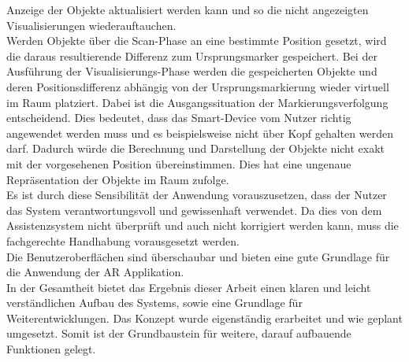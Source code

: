 Anzeige der Objekte aktualisiert werden kann und so die nicht angezeigten Visualisierungen wiederauftauchen.
\\ 
\linebreak
Werden Objekte über die Scan-Phase an eine bestimmte Position gesetzt, wird die daraus resultierende Differenz zum Ursprungsmarker gespeichert. Bei der 
Ausführung der Visualisierungs-Phase werden die gespeicherten Objekte und deren Positionsdifferenz abhängig von der Ursprungsmarkierung wieder virtuell im Raum platziert. 
Dabei ist die Ausgangssituation der Markierungsverfolgung entscheidend. Dies bedeutet, dass das Smart-Device vom Nutzer richtig angewendet werden muss und es beispielsweise 
nicht über Kopf gehalten werden darf. Dadurch würde die Berechnung und Darstellung der Objekte nicht exakt mit der vorgesehenen Position übereinstimmen. Dies hat eine 
ungenaue Repräsentation der Objekte im Raum zufolge. 
\\ 
Es ist durch diese Sensibilität der Anwendung vorauszusetzen, dass der Nutzer das System verantwortungsvoll und gewissenhaft verwendet. Da dies von dem Assistenzsystem nicht überprüft 
und auch nicht korrigiert werden kann, muss die fachgerechte Handhabung vorausgesetzt werden. 
\\ 
\linebreak
Die Benutzeroberflächen sind überschaubar und bieten eine gute Grundlage für die Anwendung der \acl{AR} Applikation. 
\\ 
\linebreak
In der Gesamtheit bietet das Ergebnis dieser Arbeit einen klaren und leicht verständlichen Aufbau des Systems, sowie eine Grundlage für Weiterentwicklungen. 
Das Konzept wurde eigenständig erarbeitet und wie geplant umgesetzt. Somit ist der Grundbaustein für weitere, darauf aufbauende Funktionen gelegt.


